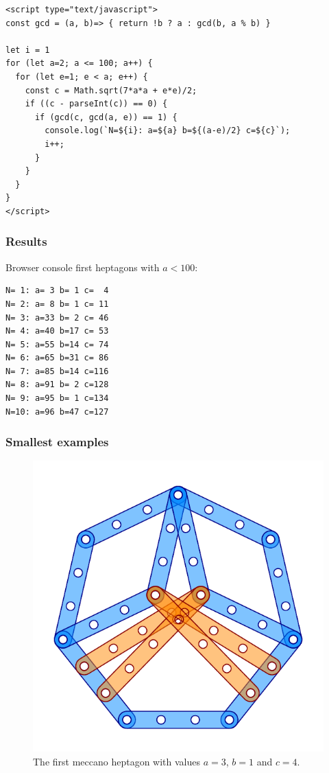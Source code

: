 \documentclass[11pt]{article}
\begin{document}
\begin{lstlisting}
<script type="text/javascript">
const gcd = (a, b)=> { return !b ? a : gcd(b, a % b) } 

let i = 1
for (let a=2; a <= 100; a++) {
  for (let e=1; e < a; e++) {
    const c = Math.sqrt(7*a*a + e*e)/2;
    if ((c - parseInt(c)) == 0) {
      if (gcd(c, gcd(a, e)) == 1) {
        console.log(`N=${i}: a=${a} b=${(a-e)/2} c=${c}`);
        i++;
      }
    }
  }
}
</script>
\end{lstlisting}

\subsubsection{Results}

Browser console first heptagons with $a < 100$:

\begin{lstlisting}
N= 1: a= 3 b= 1 c=  4
N= 2: a= 8 b= 1 c= 11
N= 3: a=33 b= 2 c= 46
N= 4: a=40 b=17 c= 53
N= 5: a=55 b=14 c= 74
N= 6: a=65 b=31 c= 86
N= 7: a=85 b=14 c=116
N= 8: a=91 b= 2 c=128
N= 9: a=95 b= 1 c=134
N=10: a=96 b=47 c=127
\end{lstlisting}

\subsubsection{Smallest examples}

\begin{figure}[htp]
\centering
\includegraphics[scale=1]{figs/heptagon-3}
\caption{The first meccano heptagon with values $a=3$, $b=1$ and $c=4$.}
\label{heptagon-3}
\end{figure}
\end{document}

